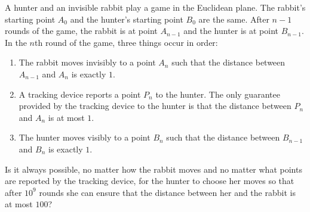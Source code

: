 A hunter and an invisible rabbit play a game in the Euclidean plane. The rabbit's starting point $A_0$ and the hunter's starting point $B_0$ are the same. After $n-1$ rounds of the game, the rabbit is at point $A_{n-1}$ and the hunter is at point $B_{n-1}$. In the $n$th round of the game, three things occur in order:
\begin{enumerate}
\item The rabbit moves invisibly to a point $A_n$ such that the distance between $A_{n-1}$ and $A_n$ is exactly $1$.
\item A tracking device reports a point $P_n$ to the hunter. The only guarantee provided by the tracking device to the hunter is that the distance between $P_n$ and $A_n$ is at most $1$.
\item The hunter moves visibly to a point $B_n$ such that the distance between $B_{n-1}$ and $B_n$ is exactly $1$.
\end{enumerate}
Is it always possible, no matter how the rabbit moves and no matter what points are reported by the tracking device, for the hunter to choose her moves so that after $10^9$ rounds she can ensure that the distance between her and the rabbit is at most $100$?
